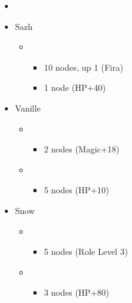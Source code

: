 \vfill
\begin{menu}
	\begin{itemize}
		\paradigm
		\begin{itemize}
			\item {}%
				  {\paradigmline[4]{\syn}{\med}{\com}}%
			      {\paradigmline{\rav}{(\rav)}{\rav}}%
			      {\paradigmline{\syn}{\med}{(\com)}}%
			      {\paradigmline{\syn}{\sab}{\rav}}%
			      {\paradigmline{\com}{(\rav)}{\com}}%
			      {\paradigmline{(\rav)}{(\rav)}{(\com)}}
		\end{itemize}
		\crystarium
		\begin{itemize}
			\item Sazh
				\begin{itemize}
					\item \rav
				    	\begin{itemize}
					    	\item 10 nodes, up 1 (Fira)
							\item 1 node (HP+40)
				        \end{itemize}
			    \end{itemize}
			\item Vanille
				\begin{itemize}
					\item \med
				    	\begin{itemize}
					    	\item 2 nodes (Magic+18)
				        \end{itemize}
				    \item \rav
				    	\begin{itemize}
				    		\item 5 nodes (HP+10)
				    	\end{itemize}
			    \end{itemize}
			\item Snow
				\begin{itemize}
					\item \rav
						\begin{itemize}
							\item 5 nodes (Role Level 3)
						\end{itemize}
					\item \sen
						\begin{itemize}
							\item 3 nodes (HP+80)
						\end{itemize}
				\end{itemize}
		\end{itemize}

\end{itemize}
\end{menu}
